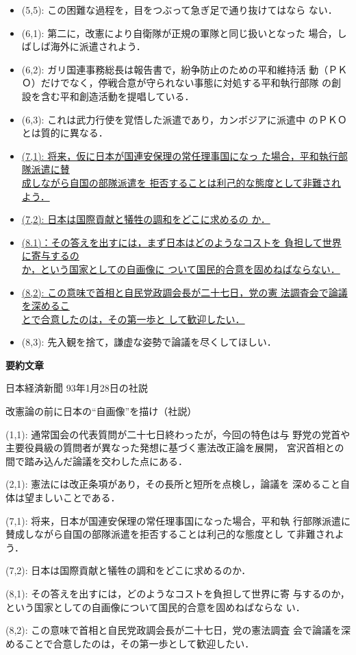 {{{\begin{itemize}
\item [] (5,5): この困難な過程を，目をつぶって急ぎ足で通り抜けてはなら
ない．
\item [] (6,1): 第二に，改憲により自衛隊が正規の軍隊と同じ扱いとなった
場合，しばしば海外に派遣されよう．
\item [] (6,2): ガリ国連事務総長は報告書で，紛争防止のための平和維持活
動（ＰＫＯ）だけでなく，停戦合意が守られない事態に対処する平和執行部隊
の創設を含む平和創造活動を提唱している．
\item [] (6,3): これは武力行使を覚悟した派遣であり，カンボジアに派遣中
のＰＫＯとは質的に異なる．
\item [] \underline{(7,1): 将来，仮に日本が国連安保理の常任理事国になっ
た場合，平和執行部隊派遣に賛}\\ \underline{成しながら自国の部隊派遣を
拒否することは利己的な態度として非難されよう．}
\item [] \underline{(7,2): 日本は国際貢献と犠牲の調和をどこに求めるの
か．}
\item [] \underline{(8.1)：その答えを出すには，まず日本はどのようなコストを
負担して世界に寄与するの}\\ \underline{か，という国家としての自画像に
ついて国民的合意を固めねばならない．}
\item [] \underline{(8,2): この意味で首相と自民党政調会長が二十七日，党の憲
法調査会で論議を深めるこ}\\ \underline{とで合意したのは，その第一歩と
して歓迎したい．}
\item [] (8,3): 先入観を捨て，謙虚な姿勢で論議を尽くしてほしい．
\end{itemize}
}
}

\vspace{5mm}

{\bf 要約文章}

\begin{itemize}
{\normalsize
 {\baselineskip=12pt
\item []日本経済新聞 93年1月28日の社説
\item []改憲論の前に日本の“自画像”を描け（社説）

\item [] (1,1): 通常国会の代表質問が二十七日終わったが，今回の特色は与
野党の党首や主要役員級の質問者が異なった発想に基づく憲法改正論を展開，
宮沢首相との間で踏み込んだ論議を交わした点にある．
\item [] (2,1): 憲法には改正条項があり，その長所と短所を点検し，論議を
深めること自体は望ましいことである．
\item [] (7,1): 将来，日本が国連安保理の常任理事国になった場合，平和執
行部隊派遣に賛成しながら自国の部隊派遣を拒否することは利己的な態度とし
て非難されよう．
\item [] (7,2): 日本は国際貢献と犠牲の調和をどこに求めるのか．
\item [] (8,1): その答えを出すには，どのようなコストを負担して世界に寄
与するのか，という国家としての自画像について国民的合意を固めねばならな
い．
\item [] (8,2): この意味で首相と自民党政調会長が二十七日，党の憲法調査
会で論議を深めることで合意したのは，その第一歩として歓迎したい．
}
}
\end{itemize}
}

